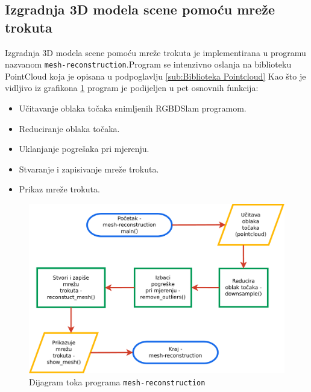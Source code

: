 


\newpage
\subsection{Izgradnja 3D modela scene pomoću mreže trokuta} %
\label{sub:Izgradnja 3D modela scene pomoću mreže trokuta}

Izgradnja 3D modela scene pomoću mreže trokuta je implementirana u
programu nazvanom \texttt{mesh-reconstruction}.\footnotemark[1]
Program se intenzivno oslanja na biblioteku PointCloud koja je opisana u
podpoglavlju \ref{sub:Biblioteka Pointcloud} Kao što je vidljivo iz
grafikona \ref{fig:flowchart} program je podijeljen u pet osnovnih
funkcija:
\begin{itemize}
    \item Učitavanje oblaka točaka snimljenih RGBDSlam programom.
    \item Reduciranje oblaka točaka.
    \item Uklanjanje pogrešaka pri mjerenju.
    \item Stvaranje i zapisivanje mreže trokuta.
    \item Prikaz mreže trokuta.
\end{itemize}


\setcounter{figure}{1}
\begin{figure}[h]
\renewcommand{\figurename}{Grafikon}
\centering
\includegraphics[scale=0.5]{figures/flowchart.pdf}
\caption{Dijagram toka programa \texttt{mesh-reconstruction} }
\label{fig:flowchart}
\end{figure}

